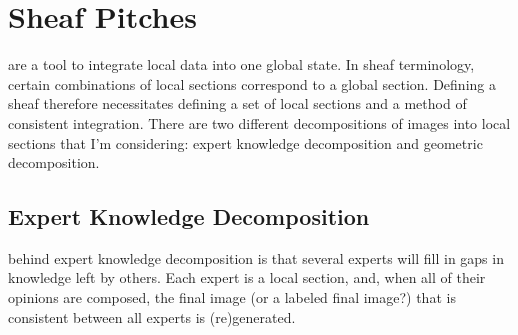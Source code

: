 \chapter{Sheaf Pitches}

 are a tool to integrate local data into one global state.
In sheaf terminology, certain combinations of local sections correspond to a
global section. Defining a sheaf therefore necessitates defining a set of local
sections and a method of consistent integration. There are two different
decompositions of images into local sections that I'm considering: expert
knowledge decomposition and geometric decomposition.

\section{Expert Knowledge Decomposition}

 behind expert knowledge decomposition is that
several experts will fill in gaps in knowledge left by others. Each expert is a
local section, and, when all of their opinions are composed, the final image
(or a labeled final image?)  that is consistent between all experts is
(re)generated.

